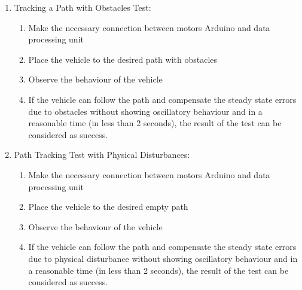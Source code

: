 \documentclass[a4paper,12pt]{article}
\begin{document}
\begin{enumerate}
\begin{enumerate}
\begin{enumerate}
			
		\item Tracking a Path with Obstacles Test:	
			\begin{enumerate}
				\item Make the necessary connection between motors Arduino and data processing unit  
				\item Place the vehicle to the desired path with obstacles  
				\item Observe the behaviour of the vehicle  
				\item If the vehicle can follow the path and compensate the steady state errors due to obstacles without showing oscillatory behaviour and in a reasonable time (in less than 2 seconds), the result of the test can be considered as success.  
			\end{enumerate}
				
		
		\item Path Tracking Test with Physical Disturbances:
			\begin{enumerate}
				\item Make the necessary connection between motors Arduino and data processing unit  
				\item Place the vehicle to the desired empty path   
				\item Observe the behaviour of the vehicle  
				\item If the vehicle can follow the path and compensate the steady state errors due to physical disturbance without showing oscillatory behaviour and in a reasonable time (in less than 2 seconds), the result of the test can be considered as success.  
			\end{enumerate}
		
		\end{enumerate}
		
		

\end{enumerate}
\end{enumerate}
\end{document}
